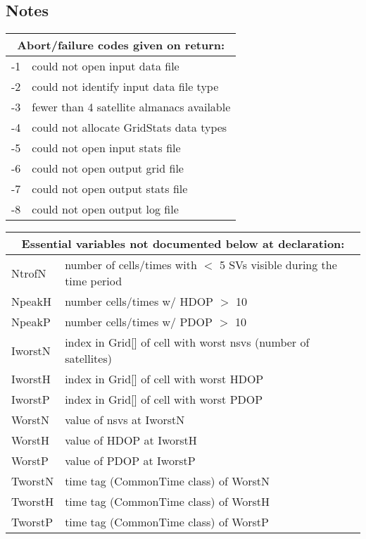 \subsection{Notes}
\begin{center}
\begin{tabular}{|l|l|}
\multicolumn{2}{c}{\textbf{Abort/failure codes given on return:}} \\
\hline
-1  &could not open input data file\\
-2  &could not identify input data file type\\
-3  &fewer than 4 satellite almanacs available\\
-4  &could not allocate GridStats data types\\
-5  &could not open input  stats file\\
-6  &could not open output grid  file\\
-7  &could not open output stats file\\
-8  &could not open output log   file\\
\hline
\end{tabular}
\end{center}


\begin{center}
\begin{tabular}{|l|l|} 
\multicolumn{2}{c}{\textbf{Essential variables not documented below at declaration:}} \\
\hline
NtrofN &  number of cells/times with $<$ 5 SVs visible during the time period\\
NpeakH &  number cells/times w/ HDOP $>$ 10\\
NpeakP &  number cells/times w/ PDOP $>$ 10\\
IworstN&  index in Grid[] of cell with worst nsvs (number of satellites)\\
IworstH&  index in Grid[] of cell with worst HDOP\\
IworstP&  index in Grid[] of cell with worst PDOP\\
WorstN &  value of nsvs at IworstN\\
WorstH &  value of HDOP at IworstH\\
WorstP &  value of PDOP at IworstP\\
TworstN&  time tag (CommonTime class) of WorstN\\
TworstH&  time tag (CommonTime class) of WorstH\\
TworstP&  time tag (CommonTime class) of WorstP\\
\hline
\end{tabular}
\end{center}



